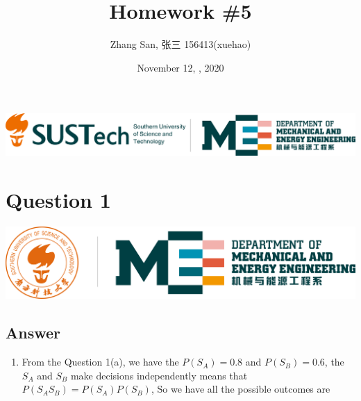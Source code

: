 \documentclass[
	12pt, %
]{fphw}
\begin{document}
\title{Homework \#5} %
\author{Zhang San, 张三 156413(xuehao)} %
\date{November 12, , 2020} %
\includegraphics[scale=0.75]{img/logo2.png}


\setlength{\abovecaptionskip}{-0.1cm}
\setlength{\belowcaptionskip}{0cm}   %


\maketitle %


\section*{Question 1}
\begin{problem}
	\includegraphics[width=440pt]{img/logo.png}
\end{problem}


\subsection*{Answer}
\begin{enumerate}
    \item From the Question 1(a), we have the $P(S_A)=0.8$ and $P(S_B)=0.6$, the $S_A$ and $S_B$ make decisions independently means that $P(S_AS_B)=P(S_A)P(S_B)$, So we have all the possible outcomes are 
\end{enumerate}
\clearpage
\end{document}
